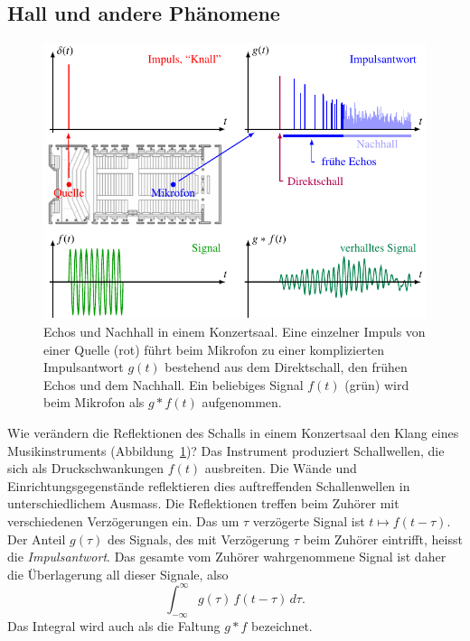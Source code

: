 \subsection{Hall und andere Phänomene
\label{buch:gruppen:faltung:subsection:hall}}
\begin{figure}
\centering
\includegraphics{chapters/030-gruppen/images/konzertsaal.pdf}
\caption{Echos und Nachhall in einem Konzertsaal.
Eine einzelner Impuls von einer Quelle (rot) führt beim Mikrofon
zu einer komplizierten Impulsantwort $g(t)$ bestehend aus
dem Direktschall, den frühen Echos und dem Nachhall.
Ein beliebiges Signal $f(t)$ (grün) wird beim Mikrofon als $g*f(t)$
aufgenommen.
\label{buch:gruppen:faltung:fig:konzertsaal}}
\end{figure}
Wie verändern die Reflektionen des Schalls in einem Konzertsaal
den Klang eines Musikinstruments
(Abbildung~\ref{buch:gruppen:faltung:fig:konzertsaal})?
Das Instrument produziert Schallwellen, die sich als Druckschwankungen
$f(t)$ ausbreiten.
Die Wände und Einrichtungsgegenstände reflektieren dies auftreffenden
Schallenwellen in unterschiedlichem Ausmass.
Die Reflektionen treffen beim Zuhörer mit verschiedenen Verzögerungen ein.
Das um $\tau$ verzögerte Signal ist $t\mapsto f(t-\tau)$.
Der Anteil $g(\tau)$ des Signals, des mit Verzögerung $\tau$ beim
Zuhörer eintrifft, heisst die {\em Impulsantwort}.
Das gesamte vom Zuhörer wahrgenommene Signal ist daher die Überlagerung
all dieser Signale, also
\begin{equation}
\int_{-\infty}^\infty
g(\tau) 
\,
f(t-\tau)
\,d\tau.
\label{buch:gruppen:faltung:eqn:hall}
\end{equation}
Das Integral wird auch als die Faltung $g*f$ bezeichnet.

